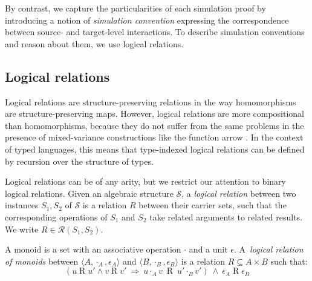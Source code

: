 \documentclass[sigplan,screen]{acmart}
\begin{document}
By contrast,
we capture the particularities of each simulation proof
by introducing a notion of \emph{simulation convention}
expressing the correspondence between
source- and target-level interactions.
To describe simulation conventions
and reason about them,
we use logical relations.



\subsection{Logical relations} \label{sec:logrel} %

Logical relations are structure-preserving relations
in the way homomorphisms are structure-preserving maps.
However,
logical relations are more compositional than homomorphisms,
because they do not suffer from the same problems
in the presence of mixed-variance constructions
like the function arrow %
\cite{lrp}.
In the context of typed languages,
this means that type-indexed logical relations
can be defined by recursion over the structure of types.


Logical relations can be of any arity,
but
we restrict our attention to
binary logical relations.
Given an algebraic structure $\mathcal{S}$,
a \emph{logical relation}
between two instances $S_1, S_2$ of $\mathcal{S}$
is a relation $R$
between their carrier sets,
such that the corresponding operations of $S_1$ and $S_2$
take related arguments to related results.
We write $R \in \mathcal{R}(S_1, S_2)$.

\begin{example}%
\label{ex:monoid}
A monoid is a set with
an associative operation $\cdot$ and
a unit $\epsilon$.
A~\emph{logical relation of monoids} between
$\langle A, \cdot_A, \epsilon_A \rangle$ and
$\langle B, \cdot_B, \epsilon_B \rangle$
is a relation $R \subseteq A \times B$
such that:
\begin{equation}
\label{eqn:monoidrel}
(u \mathrel{R} u' \wedge v \mathrel{R} v' \: \Rightarrow \:
 u \cdot_A v \: \mathrel{R} \: u' \cdot_B v')
\: \wedge \:
\epsilon_A \mathrel{R} \epsilon_B
\end{equation}
\end{example}
\end{document}
